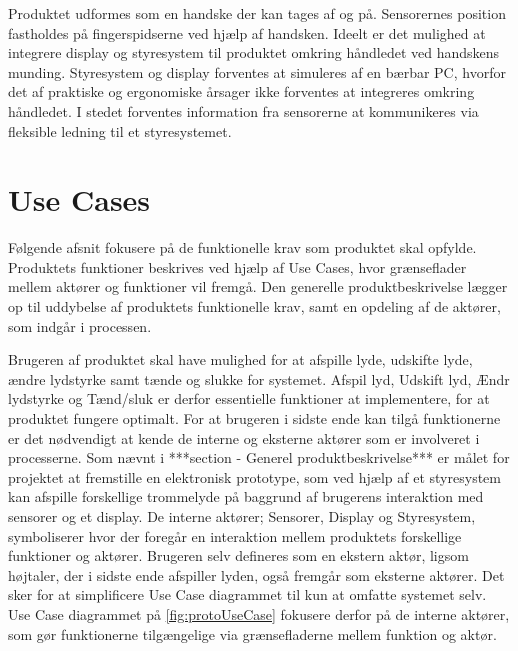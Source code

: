 Produktet udformes som en handske der kan tages af og på. Sensorernes position fastholdes på fingerspidserne ved hjælp af handsken. Ideelt er det mulighed at integrere display og styresystem til produktet omkring håndledet ved handskens munding. Styresystem og display forventes at simuleres af en bærbar PC, hvorfor det af praktiske og ergonomiske årsager ikke forventes at integreres omkring håndledet. I stedet forventes information fra sensorerne at kommunikeres via fleksible ledning til et styresystemet. 

\section{Use Cases}
Følgende afsnit fokusere på de funktionelle krav som produktet skal opfylde. Produktets funktioner beskrives ved hjælp af Use Cases, hvor grænseflader mellem aktører og funktioner vil fremgå. Den generelle produktbeskrivelse lægger op til uddybelse af produktets funktionelle krav, samt en opdeling af de aktører, som indgår i processen.

Brugeren af produktet skal have mulighed for at afspille lyde, udskifte lyde, ændre lydstyrke samt tænde og slukke for systemet. Afspil lyd, Udskift lyd, Ændr lydstyrke og Tænd/sluk er derfor essentielle funktioner at implementere, for at produktet fungere optimalt. For at brugeren i sidste ende kan tilgå funktionerne er det nødvendigt at kende de interne og eksterne aktører som er involveret i  processerne. Som nævnt i ***section - Generel produktbeskrivelse*** er målet for projektet at fremstille en elektronisk prototype, som ved hjælp af et styresystem kan afspille forskellige trommelyde på baggrund af brugerens interaktion med sensorer og et display. De interne aktører; Sensorer, Display og Styresystem, symboliserer hvor der foregår en interaktion mellem produktets forskellige funktioner og aktører. Brugeren selv defineres som en ekstern aktør, ligsom højtaler, der i sidste ende afspiller lyden, også fremgår som eksterne aktører. Det sker for at simplificere Use Case diagrammet til kun at omfatte systemet selv. Use Case diagrammet på \autoref{fig:protoUseCase} fokusere derfor på de interne aktører, som gør funktionerne tilgængelige via grænsefladerne mellem funktion og aktør. 


